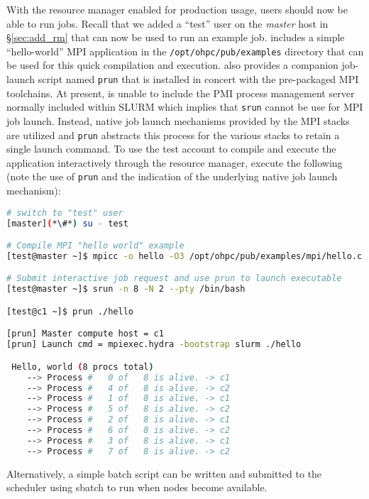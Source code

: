With the resource manager enabled for production usage, users should now be
able to run jobs.  Recall that we added a ``test'' user on the {\em master}
host in \S\ref{sec:add_rm} that can now be used to run an example job.
\OHPC{} includes a simple ``hello-world'' MPI application in the
\texttt{/opt/ohpc/pub/examples} directory that can be used for this quick
compilation and execution. \OHPC{} also provides a companion job-launch
script named \texttt{prun} that is installed in concert with the pre-packaged
MPI toolchains. At present, \OHPC{} is unable to include the PMI process management
server normally included within SLURM which implies that \texttt{srun} cannot be
use for MPI job launch. Instead, native job launch mechanisms provided by the
MPI stacks are utilized and \texttt{prun} abstracts this process for the various
stacks to retain a single launch command. To use the test account to compile and execute the
application interactively through the resource manager, execute the following
(note the use of \texttt{prun} and the indication of the underlying native job
launch mechanism):

\begin{lstlisting}[language=bash,keywords={}]
# switch to "test" user
[master](*\#*) su - test

# Compile MPI "hello world" example
[test@master ~]$ mpicc -o hello -O3 /opt/ohpc/pub/examples/mpi/hello.c

# Submit interactive job request and use prun to launch executable
[test@master ~]$ srun -n 8 -N 2 --pty /bin/bash

[test@c1 ~]$ prun ./hello

[prun] Master compute host = c1
[prun] Launch cmd = mpiexec.hydra -bootstrap slurm ./hello

 Hello, world (8 procs total)
    --> Process #   0 of   8 is alive. -> c1
    --> Process #   4 of   8 is alive. -> c2
    --> Process #   1 of   8 is alive. -> c1
    --> Process #   5 of   8 is alive. -> c2
    --> Process #   2 of   8 is alive. -> c1
    --> Process #   6 of   8 is alive. -> c2
    --> Process #   3 of   8 is alive. -> c1
    --> Process #   7 of   8 is alive. -> c2
\end{lstlisting}

Alternatively, a simple batch script can be written and submitted to the
scheduler using sbatch to run when nodes become available. 

